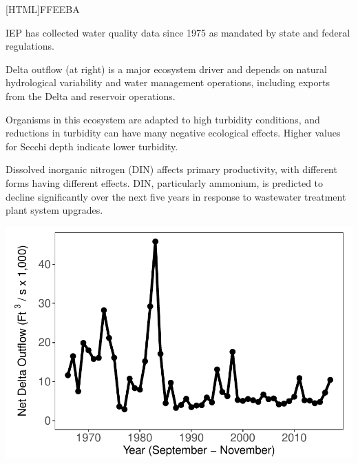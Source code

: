 \documentclass[]{article}\usepackage[]{graphicx}\usepackage[]{color}
\makeatletter
\def\maxwidth{ %
  \ifdim\Gin@nat@width>\linewidth
    \linewidth
  \else
    \Gin@nat@width
  \fi
}
\makeatother
\begin{document}
\begin{Row}
  \begin{Cell}{2}
    \setlength{\fboxrule}{1.7pt}
    [HTML]{FFEEBA}{\parbox{\textwidth}{
			\begin{itemize}[leftmargin=*]
				{\large 
					\item IEP has collected water quality data since 1975 as mandated by state 
					and federal regulations. 
					\item Delta outflow (at right) is a major ecosystem driver and depends on 
					natural hydrological variability and water management operations, including 
					exports from the Delta and reservoir operations.
					\item Organisms in this ecosystem are adapted to high turbidity conditions, 
					and reductions in turbidity can have many negative ecological effects. 
					Higher values for Secchi depth indicate lower turbidity.
					\item Dissolved inorganic nitrogen (DIN) affects primary productivity, with 
					different forms having different effects. DIN, particularly ammonium, is 
					predicted to decline significantly over the next five years in response to 
					wastewater treatment plant system upgrades.
				}
			\end{itemize}
    }}
  \end{Cell}
  \begin{Cell}{1}
    \vspace{-4.0cm}


{\centering \includegraphics[width=\maxwidth]{figures/flow_fig_1-1} 

}



  \end{Cell}
\end{Row}
\end{document}
